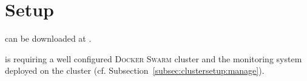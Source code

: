 
\section{\GP{} Setup}
\label{sec:genpacksetup}

\GP{} can be downloaded at \genpackschedulerrepo{}.

\GP{} is requiring a well configured \textsc{Docker Swarm} cluster and the monitoring system deployed on the cluster (cf. Subsection~\ref{subsec:clustersetup:manage}).








